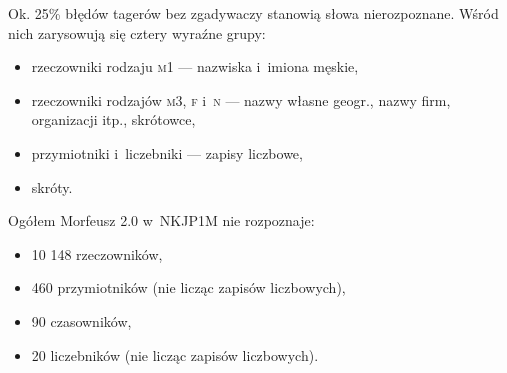 \documentclass[xcolor=dvipsnames,polish]{beamer}
\begin{document}
\begin{frame}[allowframebreaks]
\begin{columns}
  \end{columns}

 \framebreak

Ok. 25\% błędów tagerów bez zgadywaczy stanowią słowa
nierozpoznane. Wśród nich zarysowują się cztery wyraźne grupy:
\begin{itemize}
\item rzeczowniki rodzaju \textsc{m1} --- nazwiska i~imiona męskie,
\item rzeczowniki rodzajów \textsc{m3}, \textsc{f} i~\textsc{n}
  --- nazwy własne geogr., nazwy firm, organizacji itp., skrótowce,
\item przymiotniki i~liczebniki --- zapisy liczbowe,
\item skróty.
\end{itemize}

\bigskip

Ogółem Morfeusz 2.0 w~NKJP1M nie rozpoznaje:
\begin{itemize}
\item 10 148 rzeczowników,
\item 460 przymiotników (nie licząc zapisów liczbowych),
\item 90 czasowników,
\item 20 liczebników (nie licząc zapisów liczbowych).
\end{itemize}
\end{frame}
\end{document}
